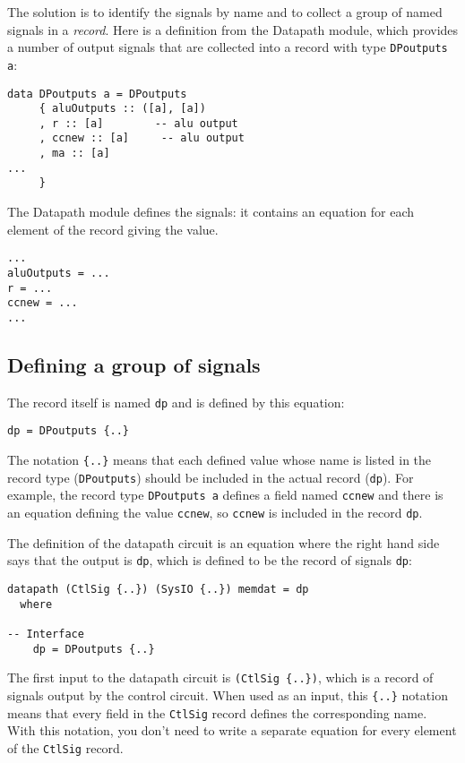 \documentclass[11pt]{article}
\begin{document}
The solution is to identify the signals by name and to collect a
group of named signals in a \emph{record}.  Here is a definition from the
Datapath module, which provides a number of output signals that are
collected into a record with type \texttt{DPoutputs a}:

\begin{verbatim}
data DPoutputs a = DPoutputs
     { aluOutputs :: ([a], [a])
     , r :: [a]        -- alu output
     , ccnew :: [a]     -- alu output
     , ma :: [a]
...
     }
\end{verbatim}

The Datapath module defines the signals: it contains an equation for
each element of the record giving the value.

\begin{verbatim}
...
aluOutputs = ...
r = ...
ccnew = ...
...
\end{verbatim}

\subsection{Defining a group of signals}
\label{sec:orge13035a}

The record itself is named \texttt{dp} and is defined by this equation:

\begin{verbatim}
dp = DPoutputs {..}
\end{verbatim}

The notation \texttt{\{..\}} means that each defined value whose name is
listed in the record type (\texttt{DPoutputs}) should be included in the
actual record (\texttt{dp}).  For example, the record type \texttt{DPoutputs a}
defines a field named \texttt{ccnew} and there is an equation defining the
value \texttt{ccnew}, so \texttt{ccnew} is included in the record \texttt{dp}.

The definition of the datapath circuit is an equation where the
right hand side says that the output is \texttt{dp}, which is defined to be
the record of signals \texttt{dp}:

\begin{verbatim}
datapath (CtlSig {..}) (SysIO {..}) memdat = dp
  where

-- Interface
    dp = DPoutputs {..}
\end{verbatim}

The first input to the datapath circuit is \texttt{(CtlSig \{..\})}, which is
a record of signals output by the control circuit.  When used as an
input, this \texttt{\{..\}} notation means that every field in the \texttt{CtlSig}
record defines the corresponding name.  With this notation, you
don't need to write a separate equation for every element of the
\texttt{CtlSig} record.
\end{document}
